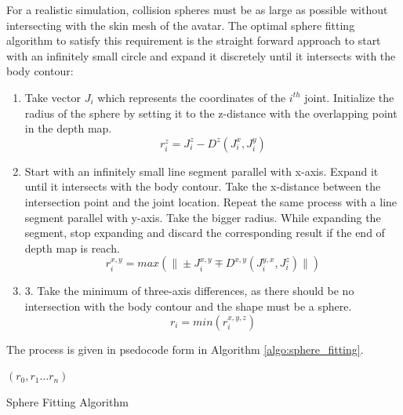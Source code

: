 \documentclass[twocolumn]{svjour3}          %
\begin{document}
For a realistic simulation, collision spheres must be as large as possible without intersecting with the skin mesh of the avatar. The optimal sphere fitting algorithm to satisfy this requirement is the straight forward approach to start with an infinitely small circle and expand it discretely until it intersects with the body contour: 
\begin{enumerate}
\item Take vector $J_i$ which represents the coordinates of the $i^{th}$
joint.
Initialize the radius of the sphere by setting it to the z-distance with the overlapping point in the depth map.
\begin{equation}
r_i^z=J_i^z-D^z(J_i^x,J_i^y)
\label{eqn:z_sphere_radius}
\end{equation}
\item Start with an infinitely small line segment parallel with x-axis. Expand it until it intersects with the body contour. Take the x-distance between the intersection point and the joint location. Repeat the same process with a line segment parallel with y-axis. Take the bigger radius. While expanding the segment, stop expanding and discard the corresponding result if the end of depth map is reach.
\begin{equation}
r_i^{x,y}=max(\| \pm J_i^{x,y} \mp D^{x,y}(J_i^{y,x},J_i^z)\|)
\label{eqn:x_y_sphere_radius}
\end{equation}
\item 3. Take the minimum of three-axis differences, as there should be no intersection with the body contour and the shape must be a sphere.
\begin{equation}
r_i=min(r_i^{x,y,z})
\label{eqn:minimum_sphere-radius}
\end{equation}
\end{enumerate}

The process is given in psedocode form in Algorithm \ref{algo:sphere_fitting}.

\begin{algorithm}
\dontprintsemicolon %
\Return $(r_0,r_1 \ldots r_n)$ 
\caption{Sphere Fitting Algorithm}
\label{algo:sphere_fitting}
\end{algorithm}  
\end{document}
